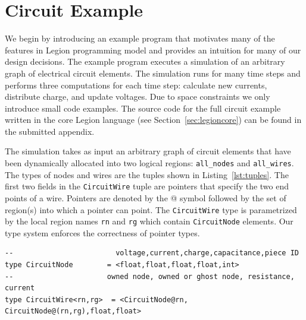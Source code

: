 
\section{Circuit Example}
\label{sec:example}


We begin by introducing an example program 
that motivates many of the features in Legion programming model
and provides an intuition for many of our design decisions.  The example program
executes a simulation of an arbitrary graph of electrical circuit elements.  
The simulation runs for many time steps and performs three computations 
for each time step: calculate new currents, distribute charge, and update voltages.
Due to space constraints we only introduce small code examples. 
The source code for the full circuit example written in the core Legion
language (see Section~\ref{sec:legioncore}) can be found in the
submitted appendix.

The simulation takes as input an arbitrary graph of circuit elements
that have been dynamically allocated into two logical regions: {\tt all\_nodes} 
and {\tt all\_wires}.  The types of nodes and wires are the tuples
shown in Listing~\ref{lst:tuples}.  The first two fields in the
{\tt CircuitWire} tuple are pointers that specify the two end points of
a wire.  Pointers are denoted by the @ symbol
followed by the set of region(s) into which a pointer can point.
The {\tt CircuitWire} type is parametrized by the local region
names {\tt rn} and {\tt rg} which contain {\tt CircuitNode} elements.
Our type system enforces the correctness of pointer types.

\begin{lstlisting}[label={lst:tuples},caption={Tuples and Pointers Example}]
--                        voltage,current,charge,capacitance,piece ID
type CircuitNode        = <float,float,float,float,int>
--                      owned node, owned or ghost node, resistance, current
type CircuitWire<rn,rg>  = <CircuitNode@rn, CircuitNode@(rn,rg),float,float>
\end{lstlisting}


